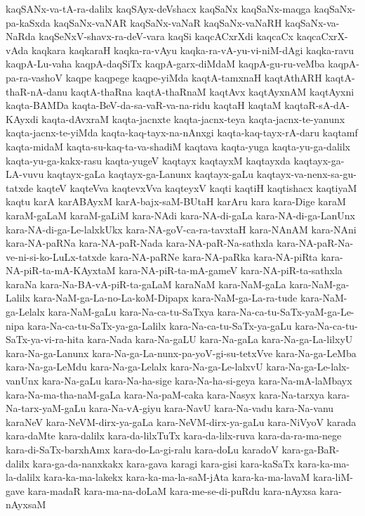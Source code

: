{kaqSANx-va-tA-ra-dalilx
kaqSAyx-deVshacx
kaqSaNx
kaqSaNx-maqga
kaqSaNx-pa-kaSxda
kaqSaNx-vaNAR
kaqSaNx-vaNaR
kaqSaNx-vaNaRH
kaqSaNx-va-NaRda
kaqSeNxV-shavx-ra-deV-vara
kaqSi
kaqcACxrXdi
kaqcaCx
kaqcaCxrX-vAda
kaqkara
kaqkaraH
kaqka-ra-vAyu
kaqka-ra-vA-yu-vi-niM-dAgi
kaqka-ravu
kaqpA-Lu-vaha
kaqpA-daqSiTx
kaqpA-garx-diMdaM
kaqpA-gu-ru-veMba
kaqpA-pa-ra-vashoV
kaqpe
kaqpege
kaqpe-yiMda
kaqtA-tamxnaH
kaqtAthARH
kaqtA-thaR-nA-danu
kaqtA-thaRna
kaqtA-thaRnaM
kaqtAvx
kaqtAyxnAM
kaqtAyxni
kaqta-BAMDa
kaqta-BeV-da-sa-vaR-va-na-ridu
kaqtaH
kaqtaM
kaqtaR-sA-dA-KAyxdi
kaqta-dAvxraM
kaqta-jacnxte
kaqta-jacnx-teya
kaqta-jacnx-te-yanunx
kaqta-jacnx-te-yiMda
kaqta-kaq-tayx-na-nAnxgi
kaqta-kaq-tayx-rA-daru
kaqtamf
kaqta-midaM
kaqta-su-kaq-ta-va-shadiM
kaqtava
kaqta-yuga
kaqta-yu-ga-dalilx
kaqta-yu-ga-kakx-rasu
kaqta-yugeV
kaqtayx
kaqtayxM
kaqtayxda
kaqtayx-ga-LA-vuvu
kaqtayx-gaLa
kaqtayx-ga-Lanunx
kaqtayx-gaLu
kaqtayx-va-nenx-sa-gu-tatxde
kaqteV
kaqteVva
kaqtevxVva
kaqteyxV
kaqti
kaqtiH
kaqtishacx
kaqtiyaM
kaqtu
karA
karABAyxM
karA-bajx-saM-BUtaH
karAru
kara
kara-Dige
karaM
karaM-gaLaM
karaM-gaLiM
kara-NAdi
kara-NA-di-gaLa
kara-NA-di-ga-LanUnx
kara-NA-di-ga-Le-lalxkUkx
kara-NA-goV-ca-ra-tavxtaH
kara-NAnAM
kara-NAni
kara-NA-paRNa
kara-NA-paR-Nada
kara-NA-paR-Na-sathxla
kara-NA-paR-Na-ve-ni-si-ko-LuLx-tatxde
kara-NA-paRNe
kara-NA-paRka
kara-NA-piRta
kara-NA-piR-ta-mA-KAyxtaM
kara-NA-piR-ta-mA-gameV
kara-NA-piR-ta-sathxla
karaNa
kara-Na-BA-vA-piR-ta-gaLaM
karaNaM
kara-NaM-gaLa
kara-NaM-ga-Lalilx
kara-NaM-ga-La-no-La-koM-Dipapx
kara-NaM-ga-La-ra-tude
kara-NaM-ga-Lelalx
kara-NaM-gaLu
kara-Na-ca-tu-SaTxya
kara-Na-ca-tu-SaTx-yaM-ga-Le-nipa
kara-Na-ca-tu-SaTx-ya-ga-Lalilx
kara-Na-ca-tu-SaTx-ya-gaLu
kara-Na-ca-tu-SaTx-ya-vi-ra-hita
kara-Nada
kara-Na-gaLU
kara-Na-gaLa
kara-Na-ga-La-lilxyU
kara-Na-ga-Lanunx
kara-Na-ga-La-nunx-pa-yoV-gi-su-tetxVve
kara-Na-ga-LeMba
kara-Na-ga-LeMdu
kara-Na-ga-Lelalx
kara-Na-ga-Le-lalxvU
kara-Na-ga-Le-lalx-vanUnx
kara-Na-gaLu
kara-Na-ha-sige
kara-Na-ha-si-geya
kara-Na-mA-laMbayx
kara-Na-ma-tha-naM-gaLa
kara-Na-paM-caka
kara-Nasyx
kara-Na-tarxya
kara-Na-tarx-yaM-gaLu
kara-Na-vA-giyu
kara-NavU
kara-Na-vadu
kara-Na-vanu
karaNeV
kara-NeVM-dirx-ya-gaLa
kara-NeVM-dirx-ya-gaLu
kara-NiVyoV
karada
kara-daMte
kara-dalilx
kara-da-lilxTuTx
kara-da-lilx-ruva
kara-da-ra-ma-nege
kara-di-SaTx-barxhAmx
kara-do-La-gi-ralu
kara-doLu
karadoV
kara-ga-BaR-dalilx
kara-ga-da-nanxkakx
kara-gava
karagi
kara-gisi
kara-kaSaTx
kara-ka-ma-la-dalilx
kara-ka-ma-lakekx
kara-ka-ma-la-saM-jAta
kara-ka-ma-lavaM
kara-liM-gave
kara-madaR
kara-ma-na-doLaM
kara-me-se-di-puRdu
kara-nAyxsa
kara-nAyxsaM
}

